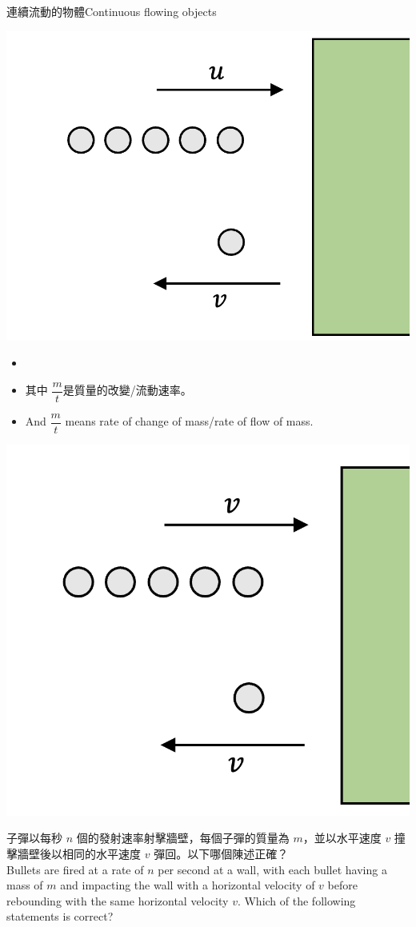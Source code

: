 \documentclass[13pt]{beamer}
\begin{document}
\begin{frame}{連續流動的物體Continuous flowing objects}
    \par
    {\par\centering
        \includegraphics[width=.4\textwidth]{assets/9bad99da.png}
        \par}
    \begin{itemize}
        \item {}
        \item 其中 $\dfrac{m}{t}$是質量的改變/流動速率。
        \item [] And $\dfrac{m}{t}$ means rate of change of mass/rate of flow of mass.
    \end{itemize}
\end{frame}

\begin{eg}
    \par{\par\centering
        \includegraphics[width=.4\textwidth]{assets/75a1ea9d.png}
        \par}
    子彈以每秒 $n$ 個的發射速率射擊牆壁，每個子彈的質量為 $m$，並以水平速度 $v$ 撞擊牆壁後以相同的水平速度 $v$ 彈回。以下哪個陳述正確？\\Bullets are fired at a rate of $n$ per second at a wall, with each bullet having a mass of $m$ and impacting the wall with a horizontal velocity of $v$ before rebounding with the same horizontal velocity $v$. Which of the following statements is correct?

\end{eg}
\end{document}
